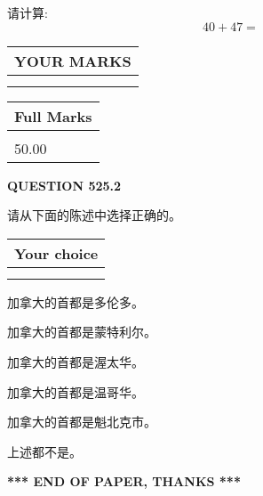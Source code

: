 \documentclass{ctexart}
\begin{document}
  
 
请计算:
\begin{equation}
40 +  %
47 = \nonumber
\end{equation}
 

 

 
  
\vspace{0.2in}
  
\noindent\begin{tabular}{|l|}
\hline
 YOUR MARKS  \\
\hline
 \\ 
 \\ 
\hline
\end{tabular}
\hspace{0.05in} \begin{tabular}{|l|}
\hline
 Full Marks  \\
\hline
 \\ 
50.00 \\
\hline
\end{tabular}
{\textbf{\Large{QUESTION
525.2 
}}}
  
  
请从下面的陈述中选择正确的。
  
  
\noindent\hspace{3.0in} \begin{tabular}{|l|}
\hline
Your choice \\
\hline
 \\ 
 \\ 
\hline
\end{tabular}
  
  
 
 
加拿大的首都是多伦多。
 
 
加拿大的首都是蒙特利尔。
 
 
加拿大的首都是渥太华。
 
 
加拿大的首都是温哥华。
 
 
加拿大的首都是魁北克市。
 
 
 上述都不是。
 
 
   
   
 \vspace{0.2in}
 
   
   
   
   
\vspace{1.0in} 
{\textbf{\large{ *** END OF PAPER, THANKS *** }}} 
   
\end{document}
